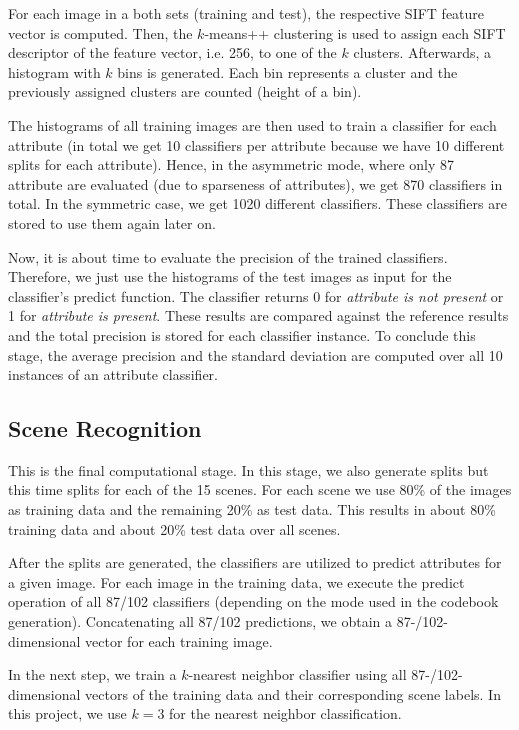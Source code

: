 \documentclass{vldb}
\begin{document}
For each image in a both sets (training and test), the respective SIFT feature
vector is computed. Then, the $k$-means++ clustering is used to assign each SIFT
descriptor of the feature vector, i.e. 256, to one of the $k$ clusters.
Afterwards, a histogram with $k$ bins is generated. Each bin represents
a cluster and the previously assigned clusters are counted (height of a bin).

The histograms of all training images are then used to train a classifier for each
attribute (in total we get 10 classifiers per attribute because we have 10
different splits for each attribute). Hence, in the asymmetric mode, where only
87 attribute are evaluated (due to sparseness of attributes), we get 870
classifiers in total. In the symmetric case, we get 1020 different classifiers.
These classifiers are stored to use them again later on.

Now, it is about time to evaluate the precision of the trained classifiers.
Therefore, we just use the histograms of the test images as input for the
classifier's predict function. The classifier returns 0 for \emph{attribute is
not present} or 1 for \emph{attribute is present}. These results are compared
against the reference results and the total precision is stored for each
classifier instance. To conclude this stage, the average precision and the
standard deviation are computed over all 10 instances of an attribute classifier.

\subsection{Scene Recognition}
\label{subsec:scene-recognition}

This is the final computational stage. In this stage, we also generate splits
but this time splits for each of the 15 scenes. For each scene we use 80\% of
the images as training data and the remaining 20\% as test data. This results in
about 80\% training data and about 20\% test data over all scenes.

After the splits are generated, the classifiers are utilized to predict attributes
for a given image. For each image in the training data, we execute the predict
operation of all 87/102 classifiers (depending on the mode used in the codebook
generation). Concatenating all 87/102 predictions, we obtain a 87-/102-dimensional
vector for each training image.

In the next step, we train a $k$-nearest neighbor classifier using all
87-/102-dimensional vectors of the training data and their corresponding scene
labels. In this project, we use $k = 3$ for the nearest neighbor classification.
\end{document}
